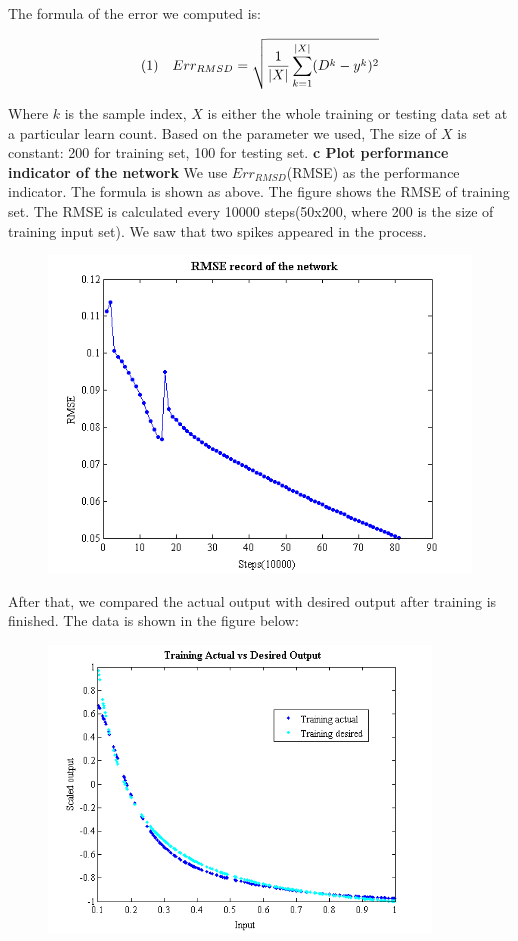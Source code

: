\documentclass[epsfig]{article}
\def\bpar{\vskip26pt}
\def\npar{\vskip13pt}
\def\spar{\vskip10pt}
\begin{document}
The formula of the error we computed is:

$$(1)\ \ \ Err_{RMSD}= \sqrt{{1\over{|X|}}\sum_{k=1}^{|X|}(D^k-y^k)^2}$$

Where $k$ is the sample index, $X$ is either the whole training or testing data set at a particular learn count. Based on the parameter we used, The size of $X$ is constant: 200 for training set, 100 for testing set.
\spar
\spar
\spar
\spar
{\bf 
\npar
c Plot performance indicator of the network
\bpar
}
We use $Err_{RMSD}$(RMSE) as the performance indicator. The formula is shown as above. The figure shows the RMSE of training set. The RMSE is calculated every 10000 steps(50x200, where 200 is the size of training input set). We saw that  two spikes appeared in the process.

\begin{figure}[!htb] 
\centering\includegraphics[width=4.5in]{fig1.png} 
\end{figure} 

\spar

After that, we compared the actual output with desired output after training is finished. The data is shown in the figure below:

\begin{figure}[!htb] 
\centering\includegraphics[width=4in]{fig2.png} 
\end{figure} 
\end{document}
